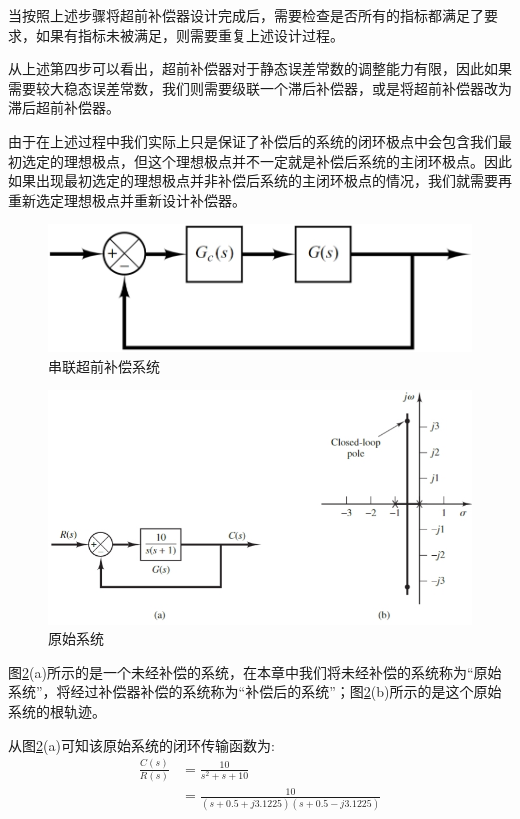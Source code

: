 \documentclass{article}
\numberwithin{equation}{section}
\numberwithin{figure}{section}
\begin{document}
当按照上述步骤将超前补偿器设计完成后，需要检查是否所有的指标都满足了要求，如果有指标未被满足，则需要重复上述设计过程。

从上述第四步可以看出，超前补偿器对于静态误差常数的调整能力有限，因此如果需要较大稳态误差常数，我们则需要级联一个滞后补偿器，或是将超前补偿器改为滞后超前补偿器。

由于在上述过程中我们实际上只是保证了补偿后的系统的闭环极点中会包含我们最初选定的理想极点，但这个理想极点并不一定就是补偿后系统的主闭环极点。因此如果出现最初选定的理想极点并非补偿后系统的主闭环极点的情况，我们就需要再重新选定理想极点并重新设计补偿器。

\begin{figure}
    \centering
    \includegraphics[width=.4\textwidth]{Chapter6/LeadCompensationSystem.png} %
    \caption{串联超前补偿系统} %
    \label{LeadCompensationSystem} %
\end{figure}

\begin{figure}
    \centering
    \includegraphics[width=.6\textwidth]{Chapter6/ExampleofLeadCompensation_originalsystem.png} %
    \caption{原始系统} %
    \label{ExampleofLeadCompensation_originalsystem} %
\end{figure}

图\ref{ExampleofLeadCompensation_originalsystem}(a)所示的是一个未经补偿的系统，在本章中我们将未经补偿的系统称为“原始系统”，将经过补偿器补偿的系统称为“补偿后的系统”；图\ref{ExampleofLeadCompensation_originalsystem}(b)所示的是这个原始系统的根轨迹。

从图\ref{ExampleofLeadCompensation_originalsystem}(a)可知该原始系统的闭环传输函数为:
\begin{equation}
    \begin{split}
        \frac{C(s)}{R(s)}&=\frac{10}{s^2+s+10}\\
        &=\frac{10}{(s+0.5+j3.1225)(s+0.5-j3.1225)}  
    \end{split}
\end{equation}
\end{document}
